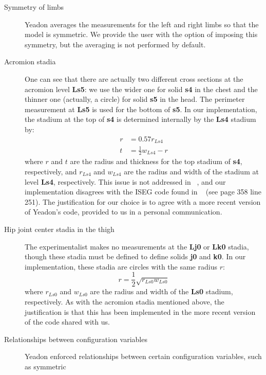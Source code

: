 \documentclass[10pt,a4paper,twocolumn]{article}
\begin{document}
\begin{description}
    \item[Symmetry of limbs] Yeadon averages the measurements for the left and
      right limbs so that the model is symmetric. We provide the user with the
      option of imposing this symmetry, but the averaging is not performed by
      default.
    \item[Acromion stadia] One can see that there are actually two different
      cross sections at the acromion level \textbf{Ls5}: we use the wider one
      for solid \textbf{s4} in the chest and the thinner one (actually, a
      circle) for solid \textbf{s5} in the head. The perimeter measurement at
      \textbf{Ls5} is used for the bottom of \textbf{s5}. In our
      implementation, the stadium at the top of \textbf{s4} is determined
      internally by the \textbf{Ls4} stadium by:
      \begin{align}
        r &= 0.57 r_{Ls4} \\
        t &= \frac{1}{2}w_{Ls4} - r
      \end{align}
      where $r$ and $t$ are the radius and thickness for the top stadium of
      \textbf{s4}, respectively, and $r_{Ls4}$ and $w_{Ls4}$ are the radius and
      width of the stadium at level \textbf{Ls4}, respectively.  This issue is
      not addressed in ~\cite{Yeadon1990c, Yeadon1990f, Yeadon1990e,
      Yeadon1990d}, and our implementation disagrees with the ISEG code found
      in ~\cite{Yeadon1984a} (see page 358 line 251). The justification for our
      choice is to agree with a more recent version of Yeadon's code, provided
      to us in a personal communication.
    \item[Hip joint center stadia in the thigh] The experimentalist makes no
      measurements at the \textbf{Lj0} or \textbf{Lk0} stadia, though these
      stadia must be defined to define solids \textbf{j0} and \textbf{k0}. In
      our implementation, these stadia are circles with the same radius $r$:
      \begin{equation}
        r = \frac{1}{2}\sqrt{r_{Ls0} w_{Ls0}}
      \end{equation}
      where $r_{Ls0}$ and $w_{Ls0}$ are the radius and width of the
      \textbf{Ls0} stadium, respectively. As with the acromion stadia mentioned
      above, the justification is that this has been implemented in the more
      recent version of the code shared with us.
    \item[Relationships between configuration variables] Yeadon enforced
      relationships between certain configuration variables, such as symmetric

\end{description}
\end{document}
